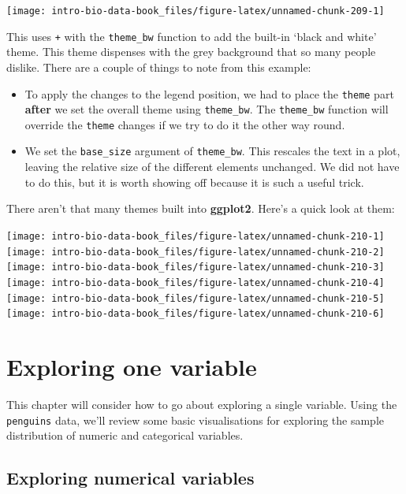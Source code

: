 \documentclass[
]{book}
\begin{document}
\begin{center}\texttt{[image: intro-bio-data-book\_files/figure-latex/unnamed-chunk-209-1]} \end{center}

This uses \texttt{+} with the \texttt{theme\_bw} function to add the built-in `black and white' theme. This theme dispenses with the grey background that so many people dislike. There are a couple of things to note from this example:

\begin{itemize}
\item
  To apply the changes to the legend position, we had to place the \texttt{theme} part \textbf{after} we set the overall theme using \texttt{theme\_bw}. The \texttt{theme\_bw} function will override the \texttt{theme} changes if we try to do it the other way round.
\item
  We set the \texttt{base\_size} argument of \texttt{theme\_bw}. This rescales the text in a plot, leaving the relative size of the different elements unchanged. We did not have to do this, but it is worth showing off because it is such a useful trick.
\end{itemize}

There aren't that many themes built into \textbf{ggplot2}. Here's a quick look at them:

\texttt{[image: intro-bio-data-book\_files/figure-latex/unnamed-chunk-210-1]} \texttt{[image: intro-bio-data-book\_files/figure-latex/unnamed-chunk-210-2]} \texttt{[image: intro-bio-data-book\_files/figure-latex/unnamed-chunk-210-3]} \texttt{[image: intro-bio-data-book\_files/figure-latex/unnamed-chunk-210-4]} \texttt{[image: intro-bio-data-book\_files/figure-latex/unnamed-chunk-210-5]} \texttt{[image: intro-bio-data-book\_files/figure-latex/unnamed-chunk-210-6]}

\hypertarget{exploring-one-variable}{%
\chapter{Exploring one variable}\label{exploring-one-variable}}

This chapter will consider how to go about exploring a single variable. Using the \texttt{penguins} data, we'll review some basic visualisations for exploring the sample distribution of numeric and categorical variables.

\hypertarget{explore-numeric}{%
\section{Exploring numerical variables}\label{explore-numeric}}
\end{document}
